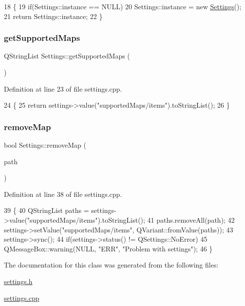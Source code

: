 \begin{DoxyCode}
18 \{
19     \textcolor{keywordflow}{if}(Settings::instance == NULL)
20         Settings::instance = \textcolor{keyword}{new} \hyperlink{class_settings}{Settings}();
21     \textcolor{keywordflow}{return} Settings::instance;
22 \}
\end{DoxyCode}
\mbox{\label{class_settings_af7963b6de1f353af5b721422f91f8096}} 
\subsubsection{\texorpdfstring{get\+Supported\+Maps}{getSupportedMaps}}
{\footnotesize\ttfamily Q\+String\+List Settings\+::get\+Supported\+Maps (\begin{DoxyParamCaption}{ }\end{DoxyParamCaption})\hspace{0.3cm}{\ttfamily [slot]}}



Definition at line 23 of file settings.\+cpp.


\begin{DoxyCode}
24 \{
25     \textcolor{keywordflow}{return} settings->value(\textcolor{stringliteral}{"supportedMaps/items"}).toStringList();
26 \}
\end{DoxyCode}
\mbox{\label{class_settings_a62312388f51c4c1a185a933128ec2e50}} 
\subsubsection{\texorpdfstring{remove\+Map}{removeMap}}
{\footnotesize\ttfamily bool Settings\+::remove\+Map (\begin{DoxyParamCaption}\item[{Q\+String}]{path }\end{DoxyParamCaption})\hspace{0.3cm}{\ttfamily [slot]}}



Definition at line 38 of file settings.\+cpp.


\begin{DoxyCode}
39 \{
40     QStringList paths = settings->value(\textcolor{stringliteral}{"supportedMaps/items"}).toStringList();
41     paths.removeAll(path);
42     settings->setValue(\textcolor{stringliteral}{"supportedMaps/items"}, QVariant::fromValue(paths));
43     settings->sync();
44     \textcolor{keywordflow}{if}(settings->status() != QSettings::NoError)
45         QMessageBox::warning(NULL, \textcolor{stringliteral}{"ERR"}, \textcolor{stringliteral}{"Problem with settings"});
46 \}
\end{DoxyCode}


The documentation for this class was generated from the following files\+:\begin{DoxyCompactItemize}
\item 
\hyperlink{settings_8h}{settings.\+h}\item 
\hyperlink{settings_8cpp}{settings.\+cpp}\end{DoxyCompactItemize}
